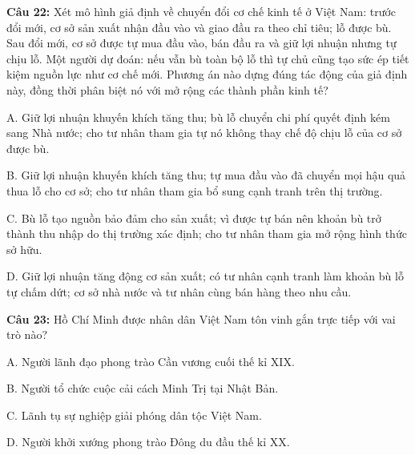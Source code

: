 \documentclass[12pt,a4paper]{article}
\begin{document}
\par\noindent\begin{minipage}{\linewidth}
\noindent\textbf{Câu 22:} Xét mô hình giả định về chuyển đổi cơ chế kinh tế ở Việt Nam: trước đổi mới, cơ sở sản xuất nhận đầu vào và giao đầu ra theo chỉ tiêu; lỗ được bù. Sau đổi mới, cơ sở được tự mua đầu vào, bán đầu ra và giữ lợi nhuận nhưng tự chịu lỗ. Một người dự đoán: nếu vẫn bù toàn bộ lỗ thì tự chủ cũng tạo sức ép tiết kiệm nguồn lực như cơ chế mới. Phương án nào dựng đúng tác động của giả định này, đồng thời phân biệt nó với mở rộng các thành phần kinh tế?\par
\noindent A. Giữ lợi nhuận khuyến khích tăng thu; bù lỗ chuyển chi phí quyết định kém sang Nhà nước; cho tư nhân tham gia tự nó không thay chế độ chịu lỗ của cơ sở được bù.\par
\noindent B. Giữ lợi nhuận khuyến khích tăng thu; tự mua đầu vào đã chuyển mọi hậu quả thua lỗ cho cơ sở; cho tư nhân tham gia bổ sung cạnh tranh trên thị trường.\par
\noindent C. Bù lỗ tạo nguồn bảo đảm cho sản xuất; vì được tự bán nên khoản bù trở thành thu nhập do thị trường xác định; cho tư nhân tham gia mở rộng hình thức sở hữu.\par
\noindent D. Giữ lợi nhuận tăng động cơ sản xuất; có tư nhân cạnh tranh làm khoản bù lỗ tự chấm dứt; cơ sở nhà nước và tư nhân cùng bán hàng theo nhu cầu.\par
\end{minipage}\par\vspace{0.12cm}

\par\noindent\begin{minipage}{\linewidth}
\noindent\textbf{Câu 23:} Hồ Chí Minh được nhân dân Việt Nam tôn vinh gắn trực tiếp với vai trò nào?\par
\noindent A. Người lãnh đạo phong trào Cần vương cuối thế kỉ XIX.\par
\noindent B. Người tổ chức cuộc cải cách Minh Trị tại Nhật Bản.\par
\noindent C. Lãnh tụ sự nghiệp giải phóng dân tộc Việt Nam.\par
\noindent D. Người khởi xướng phong trào Đông du đầu thế kỉ XX.\par
\end{minipage}\par\vspace{0.12cm}
\end{document}
